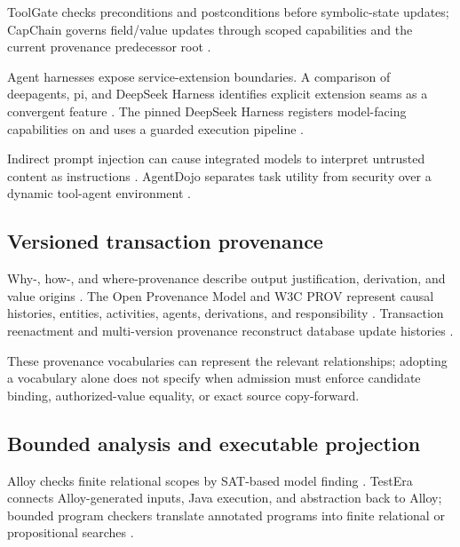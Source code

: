 ToolGate checks preconditions and postconditions before symbolic-state updates; CapChain governs field/value updates through scoped capabilities and the current provenance predecessor root \citep{liu2026toolgate,choong2026capchain}.

Agent harnesses expose service-extension boundaries. A comparison of deepagents, pi, and DeepSeek Harness identifies explicit extension seams as a convergent feature \citep{dai2026harnesses}. The pinned DeepSeek Harness registers model-facing capabilities on  and uses a guarded execution pipeline \citep{deepseek2026architecture}.

Indirect prompt injection can cause integrated models to interpret untrusted content as instructions \citep{greshake2023indirect}. AgentDojo separates task utility from security over a dynamic tool-agent environment \citep{debenedetti2024agentdojo}.

\subsection{Versioned transaction provenance}

Why-, how-, and where-provenance describe output justification, derivation, and value origins \citep{buneman2001whywhere,cheney2009provenance}. The Open Provenance Model and W3C PROV represent causal histories, entities, activities, agents, derivations, and responsibility \citep{moreau2011opm,moreau2013provdm}. Transaction reenactment and multi-version provenance reconstruct database update histories \citep{arab2016rcsi,arab2018reenactment,arab2019thesis}.

These provenance vocabularies can represent the relevant relationships; adopting a vocabulary alone does not specify when admission must enforce candidate binding, authorized-value equality, or exact source copy-forward.

\subsection{Bounded analysis and executable projection}

Alloy checks finite relational scopes by SAT-based model finding \citep{jackson2002alloy,torlak2007kodkod}. TestEra connects Alloy-generated inputs, Java execution, and abstraction back to Alloy; bounded program checkers translate annotated programs into finite relational or propositional searches \citep{marinov2001testera,dennis2006sat,galeotti2013taco}.

